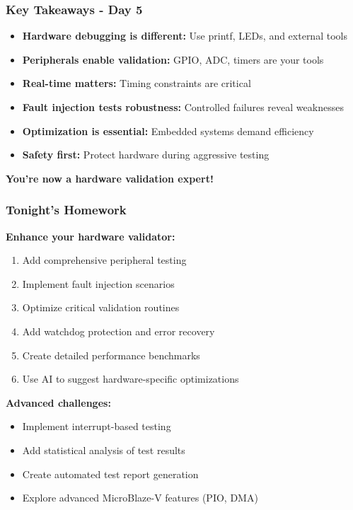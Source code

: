 \documentclass{beamer}
\begin{document}
\begin{frame}
\frametitle{Key Takeaways - Day 5}
\begin{itemize}
    \item \textbf{Hardware debugging is different:} Use printf, LEDs, and external tools
    \item \textbf{Peripherals enable validation:} GPIO, ADC, timers are your tools
    \item \textbf{Real-time matters:} Timing constraints are critical
    \item \textbf{Fault injection tests robustness:} Controlled failures reveal weaknesses
    \item \textbf{Optimization is essential:} Embedded systems demand efficiency
    \item \textbf{Safety first:} Protect hardware during aggressive testing
\end{itemize}

\vspace{0.5cm}
\begin{center}
\textbf{You're now a hardware validation expert!}
\end{center}
\end{frame}

\begin{frame}
\frametitle{Tonight's Homework}
\textbf{Enhance your hardware validator:}
\begin{enumerate}
    \item Add comprehensive peripheral testing
    \item Implement fault injection scenarios
    \item Optimize critical validation routines
    \item Add watchdog protection and error recovery
    \item Create detailed performance benchmarks
    \item Use AI to suggest hardware-specific optimizations
\end{enumerate}

\vspace{0.5cm}
\textbf{Advanced challenges:}
\begin{itemize}
    \item Implement interrupt-based testing
    \item Add statistical analysis of test results
    \item Create automated test report generation
    \item Explore advanced MicroBlaze-V features (PIO, DMA)
\end{itemize}
\end{frame}
\end{document}
